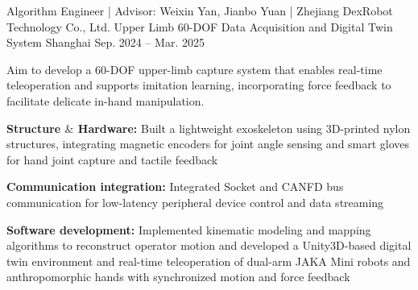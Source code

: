 \begin{cventries}

  \cventry
    {Algorithm Engineer | Advisor: Weixin Yan, Jianbo Yuan | Zhejiang DexRobot Technology Co., Ltd.} %
    {Upper Limb 60-DOF Data Acquisition and Digital Twin System} %
    {Shanghai} %
    {Sep. 2024 -- Mar. 2025} %
    {
      Aim to develop a 60-DOF upper-limb capture system that enables real-time teleoperation and supports imitation learning, incorporating force feedback to facilitate delicate in-hand manipulation.
      \vspace{4.5mm}
      \begin{cvitems}
        \item{\textbf{Structure $\&$ Hardware:} Built a lightweight exoskeleton using 3D-printed nylon structures, integrating magnetic encoders for joint angle sensing and smart gloves for hand joint capture and tactile feedback}
        \item{\textbf{Communication integration:} Integrated Socket and CANFD bus communication for low-latency peripheral device control and data streaming}
        \item{\textbf{Software development:} Implemented kinematic modeling and mapping algorithms to reconstruct operator motion and developed a Unity3D-based digital twin environment and real-time teleoperation of dual-arm JAKA Mini robots and anthropomorphic hands with synchronized motion and force feedback}
        \end{cvitems}
    }


\end{cventries}
